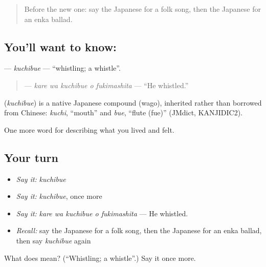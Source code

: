 \label{lesson:JA-C470-kuchibue}



\begin{quote}
Before the new one: say the Japanese for a folk song, then the Japanese for an enka ballad.
\end{quote}

\subsection*{You'll want to know: }
\textbf{} — \emph{kuchibue} — \textquotedblleft{}whistling; a whistle\textquotedblright{}.

\begin{quote}
\textbf{  } — \emph{kare wa kuchibue o fukimashita} — \textquotedblleft{}He whistled.\textquotedblright{}
\end{quote}

\begin{cousinweb}
\textbf{} (\emph{kuchibue}) is a native Japanese compound (wago), inherited rather than borrowed from Chinese: \emph{kuchi}, \textquotedblleft{}mouth\textquotedblright{} and \emph{bue}, \textquotedblleft{}flute (fue)\textquotedblright{} (JMdict, KANJIDIC2).
\end{cousinweb}

\begin{grammarlens}[title={What you've built}]
One more word for describing what you lived and felt.
\end{grammarlens}

\subsection*{Your turn}
\begin{itemize}
\raggedright
  \item \emph{Say it:} \emph{kuchibue}
  \item \emph{Say it:} \emph{kuchibue}, once more
  \item \emph{Say it:} \emph{kare wa kuchibue o fukimashita} — He whistled.
  \item \emph{Recall:} say the Japanese for a folk song, then the Japanese for an enka ballad, then say \emph{kuchibue} again
\end{itemize}

\begin{tcolorbox}[breakable,colback=teal!4,colframe=teal!35!black,title={Before you move on}]
What does  mean? (\textquotedblleft{}Whistling; a whistle\textquotedblright{}.) Say it once more.
\end{tcolorbox}
